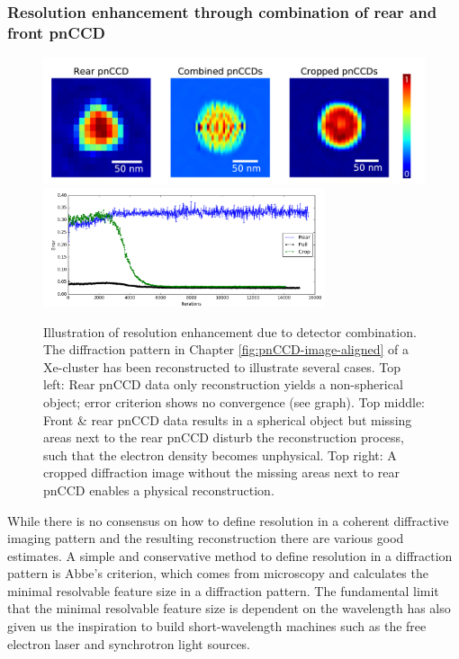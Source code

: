\subsubsection{Resolution enhancement through combination of rear and front pnCCD}\label{sec:resolution-discussion}
\begin{figure}
  \begin{center}
   \includegraphics[width=0.8\linewidth]{images/Phase-retrieval-image.png}\\
   \includegraphics[height=3.5cm]{images/Phase-retrieval-error.png}
    \caption[Illustration of resolution enhancement and diffraction image cropping.]{Illustration of resolution enhancement due to detector combination. The diffraction pattern in Chapter \ref{fig:pnCCD-image-aligned} of a Xe-cluster has been reconstructed to illustrate several cases. Top left: Rear pnCCD data only reconstruction yields a non-spherical object; error criterion shows no convergence (see graph). Top middle: Front \& rear pnCCD data results in a spherical object but missing areas next to the rear pnCCD disturb the reconstruction process, such that the electron density becomes unphysical. Top right: A cropped diffraction image without the missing areas next to rear pnCCD enables a physical reconstruction.}
\label{fig:phase-retrieval-image}
  \end{center}
\end{figure}
While there is no consensus on how to define resolution in a coherent diffractive imaging pattern and the resulting reconstruction there are various good estimates. A simple and conservative method to define resolution in a diffraction pattern is Abbe's criterion, which comes from microscopy and calculates the minimal resolvable feature size in a diffraction pattern. The fundamental limit that the minimal resolvable feature size is dependent on the wavelength has also given us the inspiration to build short-wavelength machines such as the free electron laser and synchrotron light sources.\\
